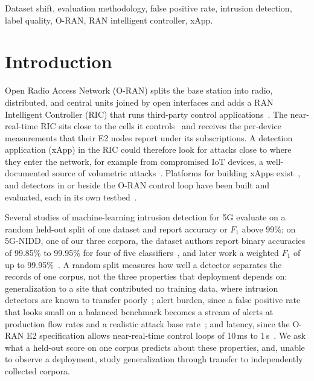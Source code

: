 \documentclass{ieeeaccess}
\begin{document}
\begin{keywords}
Dataset shift, evaluation methodology, false positive rate, intrusion detection, label quality, O-RAN, RAN intelligent controller, xApp.
\end{keywords}

\titlepgskip=-21pt

\maketitle

\section{Introduction}
\label{sec:intro}

Open Radio Access Network (O-RAN) splits the base station into radio, distributed, and central units joined by open interfaces and adds a RAN Intelligent Controller (RIC) that runs third-party control applications~\cite{polese2023understanding,abdalla2022toward,niknam2022intelligent}. The near-real-time RIC sits close to the cells it controls~\cite{bonati2021intelligence,polese2023understanding} and receives the per-device measurements that their E2 nodes report under its subscriptions. A detection application (xApp) in the RIC could therefore look for attacks close to where they enter the network, for example from compromised IoT devices, a well-documented source of volumetric attacks~\cite{antonakakis2017mirai,kolias2017ddos}. Platforms for building xApps exist~\cite{polese2023coloran,schmidt2021flexric}, and detectors in or beside the O-RAN control loop have been built and evaluated, each in its own testbed~\cite{wen2024spector,scalingi2024detran}.

Several studies of machine-learning intrusion detection for 5G evaluate on a random held-out split of one dataset and report accuracy or $F_1$ above 99\%; on 5G-NIDD, one of our three corpora, the dataset authors report binary accuracies of 99.85\% to 99.95\% for four of five classifiers~\cite{samarakoon2022niddarxiv}, and later work a weighted $F_1$ of up to 99.95\%~\cite{ilias2024moe5g}. A random split measures how well a detector separates the records of one corpus, not the three properties that deployment depends on: generalization to a site that contributed no training data, where intrusion detectors are known to transfer poorly~\cite{layeghy2022generalisability,layeghy2023benchmarking}; alert burden, since a false positive rate that looks small on a balanced benchmark becomes a stream of alerts at production flow rates and a realistic attack base rate~\cite{axelsson2000baserate,sommer2010outside}; and latency, since the O-RAN E2 specification allows near-real-time control loops of 10\,ms to 1\,s~\cite{etsi_e2gap}. We ask what a held-out score on one corpus predicts about these properties, and, unable to observe a deployment, study generalization through transfer to independently collected corpora.
\end{document}

